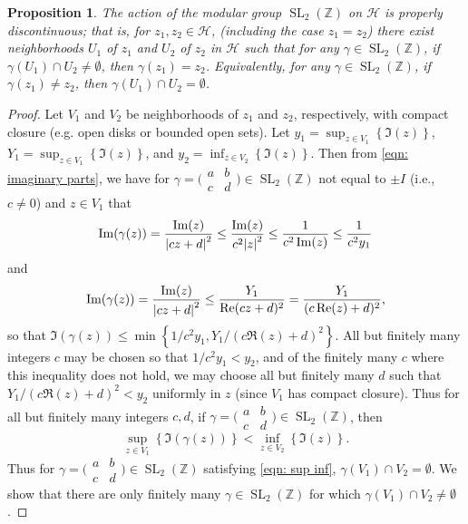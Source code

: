 \documentclass[10pt,leqno,twoside]{article}
\theoremstyle{plain}
\newtheorem{proposition}[lem]{Proposition}
\theoremstyle{definition}
\numberwithin{equation}{section}
\numberwithin{lem}{section}
\newcommand{\cbr}[1]{\left\{#1\right\}}
\DeclareMathOperator{\SL}{SL}
\newcommand{\slz}{\SL_2(\mathbb{Z})}
\begin{document}
\begin{proposition}\label{prop: properly discontinuous}
    The action of the modular group $\slz$ on $\mathcal H$ is properly discontinuous; that is, for $z_1,z_2\in \mathcal H$, (including the case $z_1 = z_2$) there exist neighborhoods $U_1$ of $z_1$ and $U_2$ of $z_2$ in $\mathcal H$ such that for any $\gamma\in \slz$, if $\gamma(U_1)\cap U_2\neq \emptyset$, then $\gamma(z_1) = z_2$. Equivalently, for any $\gamma\in\slz$, if $\gamma(z_1)\neq z_2$, then $\gamma(U_1)\cap U_2= \emptyset$.
\end{proposition}
\begin{proof}
    Let $V_1$ and $V_2$ be neighborhoods of $z_1$ and $z_2$, respectively, with compact closure (e.g. open disks or bounded open sets). Let $y_1 = \sup_{z\in V_1}\cbr{\Im(z)}$, $Y_1 = \sup_{z\in V_1}\cbr{\Im(z)}$, and $y_2 = \inf_{z\in V_2}\cbr{\Im(z)}$. Then from \cref{eqn: imaginary parts}, we have for $\gamma = \big(\!\begin{smallmatrix}
        a & b \\ c & d
    \end{smallmatrix}\!\big)\in \slz$ not equal to $\pm I$ (i.e., $c\neq 0$) and $z\in V_1$ that \[\Im(\gamma(z)) = \frac{\Im(z)}{\abs{cz+d}^2}\leq \frac{\Im(z)}{c^2\abs{z}^2}\leq \frac{1}{c^2\Im(z)}\leq \frac{1}{c^2y_1}\] and \[\Im(\gamma(z)) = \frac{\Im(z)}{\abs{cz+d}^2}\leq \frac{Y_1}{\Re(cz+d)^2} = \frac{Y_1}{(c\Re(z)+d)^2},\] so that $\Im(\gamma(z))\leq\min\cbr{1/c^2y_1,Y_1/(c\Re(z)+d)^2}$. All but finitely many integers $c$ may be chosen so that $1/c^2y_1< y_2$, and of the finitely many $c$ where this inequality does not hold, we may choose all but finitely many $d$ such that $Y_1/(c\Re(z)+d)^2< y_2$ uniformly in $z$ (since $V_1$ has compact closure). Thus for all but finitely many integers $c,d$, if $\gamma  = \big(\!\begin{smallmatrix}
        a & b \\ c & d
    \end{smallmatrix}\!\big)\in \slz$, then \begin{equation}\label{eqn: sup inf}
        \sup_{z\in V_1}\cbr{\Im(\gamma(z))}< \inf_{z\in V_2}\cbr{\Im(z)}.
    \end{equation} Thus for $\gamma = \big(\!\begin{smallmatrix}
        a & b \\ c & d
    \end{smallmatrix}\!\big)\in \slz$ satisfying \cref{eqn: sup inf}, $\gamma(V_1)\cap V_2=\emptyset$. We show that there are only finitely many $\gamma\in \slz$ for which $\gamma(V_1)\cap V_2\neq\emptyset$.


\end{proof}
\end{document}
